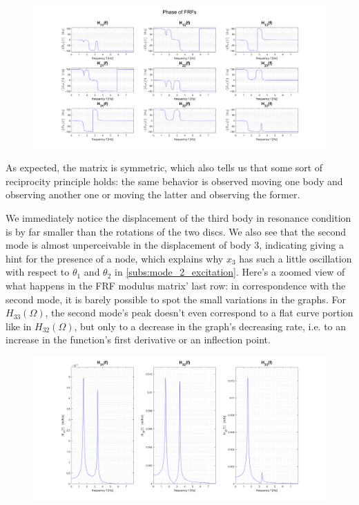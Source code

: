 \documentclass[a4paper,12pt,oneside]{article}
\begin{document}
\begin{figure}[H]
	\hspace{-70pt}
	\includegraphics[scale=0.4]{frfs_phase}
\end{figure}

As expected, the matrix is symmetric, which also tells us that some sort of reciprocity principle holds: the same behavior is observed moving one body and observing another one or moving the latter and observing the former.

We immediately notice the displacement of the third body in resonance condition is by far smaller than the rotations of the two discs. We also see that the second mode is almost unperceivable in the displacement of body 3, indicating giving a hint for the presence of a node, which explains why $ x_3 $ has such a little oscillation with respect to $ \theta_1 $ and $ \theta_2 $ in \ref{subs:mode_2_excitation}. Here's a zoomed view of what happens in the FRF modulus matrix' last row: in correspondence with the second mode, it is barely possible to spot the small variations in the graphs. For $ H_{33}(\Omega) $, the second mode's peak doesn't even correspond to a flat curve portion like in $ H_{32}(\Omega) $, but only to a decrease in the graph's decreasing rate, i.e. to an increase in the function's first derivative or an inflection point.

\begin{figure}
	\hspace{-70pt}
	\includegraphics[scale=0.4]{frfs_modulus_x3}
\end{figure}
\end{document}
